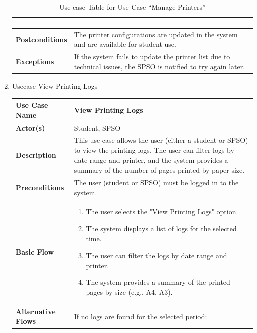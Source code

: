 \documentclass[a4paper]{report}
\begin{document}
\begin{enumerate}
\begin{table}[h!]
\begin{tabular}{|>{\centering\arraybackslash}m{3cm}|>{\raggedright\arraybackslash}m{10cm}|}
\begin{enumerate}
            \end{enumerate} \\ \hline
            \textbf{Postconditions} & The printer configurations are updated in the system and are available for student use. \\ \hline
            \textbf{Exceptions} & If the system fails to update the printer list due to technical issues, the SPSO is notified to try again later. \\ [2ex] \hline
            \end{tabular}
            \caption{Use-case Table for Use Case “Manage Printers”}
            \label{tab:manage_printers_use_case}
        \end{table}

    \newpage
    \item Usecase View Printing Logs
        \begin{table}[h!]
            \centering
            \renewcommand{\arraystretch}{1.8}
            \begin{tabular}{|>{\centering\arraybackslash}m{3cm}|>{\raggedright\arraybackslash}m{10cm}|}
            \hline
            \textbf{Use Case Name} & View Printing Logs \\ \hline
            \textbf{Actor(s)} & Student, SPSO \\ \hline
            \textbf{Description} & This use case allows the user (either a student or SPSO) to view the printing logs. The user can filter logs by date range and printer, and the system provides a summary of the number of pages printed by paper size. \\ \hline
            \textbf{Preconditions} & The user (student or SPSO) must be logged in to the system. \\ \hline
            \textbf{Basic Flow} & 
            \begin{enumerate}
                \item The user selects the "View Printing Logs" option.
                \item The system displays a list of logs for the selected time.
                \item The user can filter the logs by date range and printer.
                \item The system provides a summary of the printed pages by size (e.g., A4, A3).
            \end{enumerate} \\ \hline
            \textbf{Alternative Flows} & 
            If no logs are found for the selected period:

\end{tabular}
\end{table}
\end{enumerate}
\end{document}
